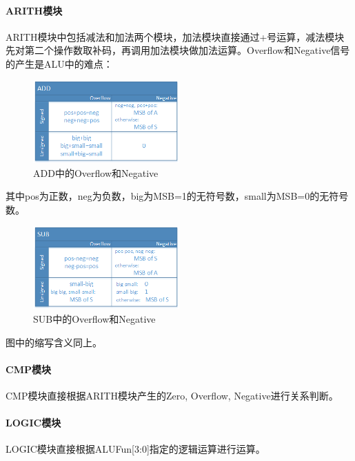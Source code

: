 \documentclass{article}
\begin{document}
            \paragraph*{ARITH模块}
            ARITH模块中包括减法和加法两个模块，加法模块直接通过+号运算，减法模块先对第二个操作数取补码，再调用加法模块做加法运算。Overflow和Negative信号的产生是ALU中的难点：
            \begin{figure}[H]
                \centering
                \includegraphics[width=0.5\textwidth]{images/add_v_n.png}
                \caption{\label{fig:add_v_n}ADD中的Overflow和Negative}
            \end{figure}
            其中pos为正数，neg为负数，big为MSB=1的无符号数，small为MSB=0的无符号数。

            \begin{figure}[H]
                \centering
                \includegraphics[width=0.5\textwidth]{images/sub_v_n.png}
                \caption{\label{fig:sub_v_n}SUB中的Overflow和Negative}
            \end{figure}
            图中的缩写含义同上。

            \paragraph*{CMP模块}
            CMP模块直接根据ARITH模块产生的Zero, Overflow, Negative进行关系判断。

            \paragraph*{LOGIC模块}
            LOGIC模块直接根据ALUFun[3:0]指定的逻辑运算进行运算。
\end{document}
